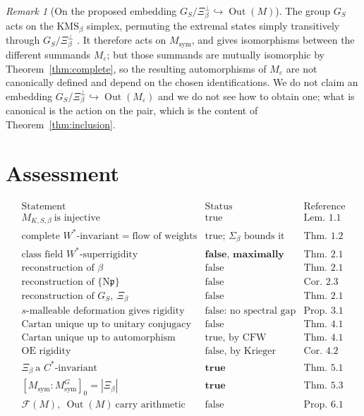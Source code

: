 \documentclass[11pt]{amsart}
\numberwithin{equation}{section}
\theoremstyle{definition}
\theoremstyle{remark}
\newtheorem{remark}[theorem]{Remark}
\newcommand{\cF}{\mathcal{F}}
\newcommand{\pp}{\mathfrak{p}}
\newcommand{\Ns}{\mathrm{N}}
\newcommand{\Out}{\operatorname{Out}}
\newcommand{\Msym}{M_{\mathrm{sym}}}
\begin{document}
\begin{remark}[On the proposed embedding $G_S/\Xi_\beta^\perp\hookrightarrow\Out(M)$]\label{rem:out}
The group $G_S$ acts on the $\mathrm{KMS}_\beta$ simplex, permuting the extremal states
simply transitively through $G_S/\Xi_\beta^\perp$ \cite[Thm.~3.6(3)]{Main}. It therefore acts
on $\Msym$, and gives isomorphisms between the different summands $M_\varepsilon$; but those
summands are mutually isomorphic by Theorem~\ref{thm:complete}, so the resulting
automorphisms of $M_\varepsilon$ are not canonically defined and depend on the chosen
identifications. We do not claim an embedding $G_S/\Xi_\beta^\perp\hookrightarrow\Out(M_\varepsilon)$
and we do not see how to obtain one; what is canonical is the action on the pair, which is
the content of Theorem~\ref{thm:inclusion}.
\end{remark}

\section{Assessment}

\[
\begin{array}{lll}
\text{Statement} & \text{Status} & \text{Reference}\\\hline
M_{K,S,\beta}\ \text{is injective} & \text{true} & \text{Lem.~1.1}\\
\text{complete }W^*\text{-invariant}=\text{flow of weights} & \text{true; }\Sigma_\beta\text{ bounds it} & \text{Thm.~1.2}\\
\text{class field }W^*\text{-superrigidity} & \textbf{false, maximally} & \text{Thm.~2.1}\\
\text{reconstruction of }\beta & \text{false} & \text{Thm.~2.1}\\
\text{reconstruction of }\{\Ns\pp\} & \text{false} & \text{Cor.~2.3}\\
\text{reconstruction of }G_S,\ \Xi_\beta & \text{false} & \text{Thm.~2.1}\\
s\text{-malleable deformation gives rigidity} & \text{false: no spectral gap} & \text{Prop.~3.1}\\
\text{Cartan unique up to unitary conjugacy} & \text{false} & \text{Thm.~4.1}\\
\text{Cartan unique up to automorphism} & \text{true, by CFW} & \text{Thm.~4.1}\\
\text{OE rigidity} & \text{false, by Krieger} & \text{Cor.~4.2}\\
\Xi_\beta\ \text{a }C^*\text{-invariant} & \textbf{true} & \text{Thm.~5.1}\\
{[\Msym:\Msym^G]_0}=|\Xi_\beta| & \textbf{true} & \text{Thm.~5.3}\\
\cF(M),\ \Out(M)\ \text{carry arithmetic} & \text{false} & \text{Prop.~6.1}
\end{array}
\]
\end{document}
